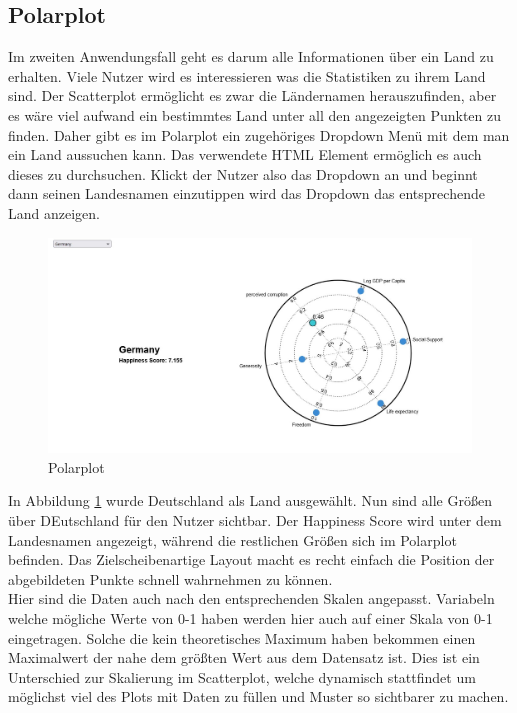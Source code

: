 \subsection{Polarplot}

Im zweiten Anwendungsfall geht es darum alle Informationen über ein Land zu erhalten. Viele Nutzer wird es interessieren was die Statistiken zu ihrem Land sind. Der Scatterplot ermöglicht es zwar die Ländernamen herauszufinden, aber es wäre viel aufwand ein bestimmtes Land unter all den angezeigten Punkten zu finden. Daher gibt es im Polarplot ein zugehöriges Dropdown Menü mit dem man ein Land aussuchen kann. Das verwendete HTML Element ermöglich es auch dieses zu durchsuchen. Klickt der Nutzer also das Dropdown an und beginnt dann seinen Landesnamen einzutippen wird das Dropdown das entsprechende Land anzeigen. \\

\begin{figure}[h]
 \centering
 \includegraphics[width = \textwidth]{img/polarplot.jpg}
 \caption{Polarplot}
 \label{fig:polar_example}
\end{figure}

In Abbildung \ref{fig:polar_example} wurde Deutschland als Land ausgewählt. Nun sind alle Größen über DEutschland für den Nutzer sichtbar. Der Happiness Score wird unter dem Landesnamen angezeigt, während die restlichen Größen sich im Polarplot befinden. Das Zielscheibenartige Layout macht es recht einfach die Position der abgebildeten Punkte schnell wahrnehmen zu können. \\

Hier sind die Daten auch nach den entsprechenden Skalen angepasst. Variabeln welche mögliche Werte von 0-1 haben werden hier auch auf einer Skala von 0-1 eingetragen. Solche die kein theoretisches Maximum haben bekommen einen Maximalwert der nahe dem größten Wert aus dem Datensatz ist. Dies ist ein Unterschied zur Skalierung im Scatterplot, welche dynamisch stattfindet um möglichst viel des Plots mit Daten zu füllen und Muster so sichtbarer zu machen. 


